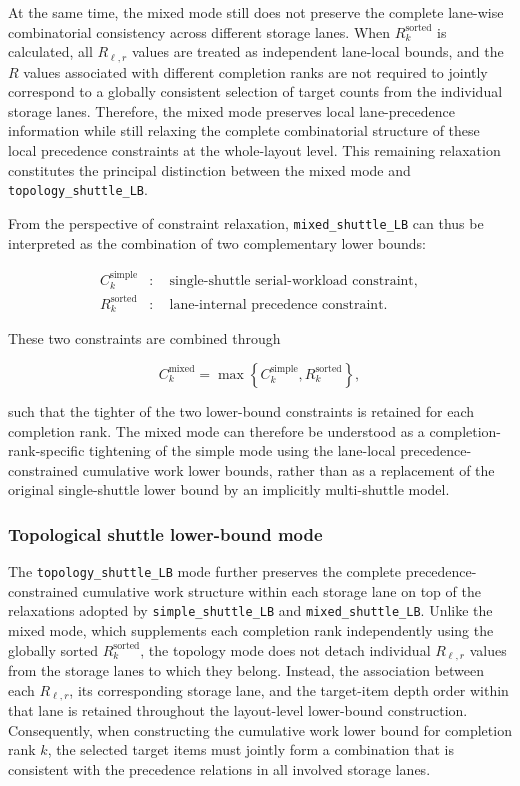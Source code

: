 At the same time, the mixed mode still does not preserve the complete
lane-wise combinatorial consistency across different storage lanes. When
\(R_k^{\mathrm{sorted}}\) is calculated, all \(R_{\ell,r}\) values are treated
as independent lane-local bounds, and the \(R\) values associated with
different completion ranks are not required to jointly correspond to a
globally consistent selection of target counts from the individual storage
lanes. Therefore, the mixed mode preserves local lane-precedence information
while still relaxing the complete combinatorial structure of these local
precedence constraints at the whole-layout level. This remaining relaxation
constitutes the principal distinction between the mixed mode and
\texttt{topology\_shuttle\_LB}.

From the perspective of constraint relaxation,
\texttt{mixed\_shuttle\_LB} can thus be interpreted as the combination of two
complementary lower bounds:

\[
\begin{aligned}
C_k^{\mathrm{simple}}
&:
\quad
\text{single-shuttle serial-workload constraint},
\\
R_k^{\mathrm{sorted}}
&:
\quad
\text{lane-internal precedence constraint}.
\end{aligned}
\]

These two constraints are combined through

\[
C_k^{\mathrm{mixed}}
=
\max
\left\{
C_k^{\mathrm{simple}},
R_k^{\mathrm{sorted}}
\right\},
\]

such that the tighter of the two lower-bound constraints is retained for each
completion rank. The mixed mode can therefore be understood as a
completion-rank-specific tightening of the simple mode using the lane-local
precedence-constrained cumulative work lower bounds, rather than as a
replacement of the original single-shuttle lower bound by an implicitly
multi-shuttle model.

\subsubsection{Topological shuttle lower-bound mode}

The \texttt{topology\_shuttle\_LB} mode further preserves the complete
precedence-constrained cumulative work structure within each storage lane on top
of the relaxations adopted by \texttt{simple\_shuttle\_LB} and
\texttt{mixed\_shuttle\_LB}. Unlike the mixed mode, which supplements each
completion rank independently using the globally sorted
\(R_k^{\mathrm{sorted}}\), the topology mode does not detach individual
\(R_{\ell,r}\) values from the storage lanes to which they belong. Instead, the
association between each \(R_{\ell,r}\), its corresponding storage lane, and
the target-item depth order within that lane is retained throughout the
layout-level lower-bound construction. Consequently, when constructing the
cumulative work lower bound for completion rank \(k\), the selected target items
must jointly form a combination that is consistent with the precedence
relations in all involved storage lanes.

